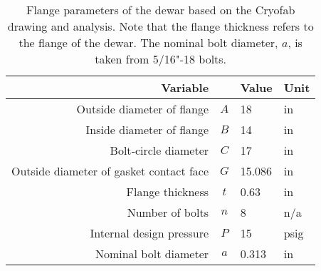 \begin{table}[h]
\begin{center}
\tabcolsep=10pt
\begin{tabular}{r|c|l|l}
\hline
\hline
Variable & & Value & Unit \\
\hline
Outside diameter of flange & $A$ & 18 & in \\
Inside diameter of flange & $B$ & 14 & in \\
Bolt‐circle diameter & $C$ & 17 & in \\
Outside diameter of gasket contact face & $G$ & 15.086 & in \\
Flange thickness & $t$ & 0.63 & in \\
Number of bolts & $n$ & 8 & n/a \\
Internal design pressure & $P$ & 15 & psig \\
Nominal bolt diameter & $a$ & 0.313 & in \\
\hline
\hline
\end{tabular}
\caption{Flange parameters of the dewar based on the Cryofab drawing
and analysis.  Note that the flange thickness refers to the flange
of the dewar.  The nominal bolt diameter, $a$, is taken from 5/16"-18 bolts.}
\label{table:ring_flange}
\end{center}
\end{table}
